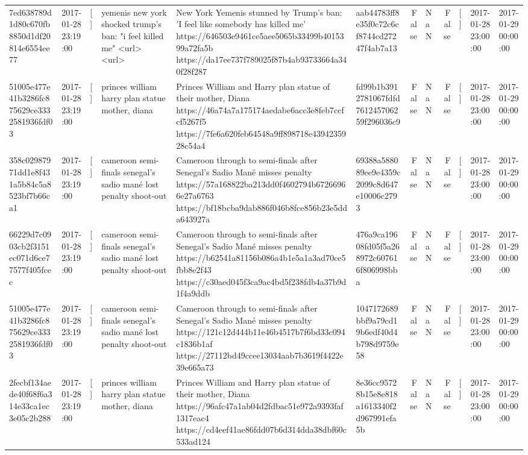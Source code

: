 \begin{tabular}{llllllrlrlll}
7ed638789d1d80c670fb8850d1df20814e6554ee77 & 2017-01-28 23:19:00 & [] & yemenis new york shocked trump's ban: "i feel killed me" <url> <url> & New York Yemenis stunned by Trump's ban: 'I feel like somebody has killed me' https://646503e9461ce5aee5065b33499b4015399a72fa5b https://da17ee737f789025f87b4ab93733664a340f28f287 & aab44783ff8e35f0c72c6cf8744cd27247f4ab7a13 & False & NaN & False & [] & 2017-01-28 23:00:00 & 2017-01-29 00:00:00 \\
51005e477e41b3286fc875629ce3332581936fdf03 & 2017-01-28 23:19:00 & [] & princes william harry plan statue mother, diana & Princes William and Harry plan statue of their mother, Diana https://46a74a7a175174aedabe6acc3e8feb7ccfcf5267f5 https://7fe6a620feb64548a9ff898718e4394235928c54a4 & fd99b1b3912781067fdfd761245706259f296036c9 & False & NaN & False & [] & 2017-01-28 23:00:00 & 2017-01-29 00:00:00 \\
358c02987971dd1e8f431a5b84c5a8523bf7b66ca1 & 2017-01-28 23:19:00 & [] & cameroon semi-finals senegal's sadio mané lost penalty shoot-out & Cameroon through to semi-finals after Senegal’s Sadio Mané misses penalty https://57a168822ba213dd0f4602794b67266966e27a6763 https://bf18bcba9dab886f046b8fce856b23e5dda643927a & 69388a588089ee9e4359c2099c8d647e10006c2793 & False & NaN & False & [] & 2017-01-28 23:00:00 & 2017-01-29 00:00:00 \\
66229d7c0903cb2f3151ec071d6ce77577f405fcec & 2017-01-28 23:19:00 & [] & cameroon semi-finals senegal's sadio mané lost penalty shoot-out & Cameroon through to semi-finals after Senegal’s Sadio Mané misses penalty https://b62541a81156b086a4b1e5a1a3ad70ce5fbb8e2f43 https://c30aed045f3ca9ac4bd5f238fdb4a37b9d1f4a9ddb & 476a9ca19608fd05f5a268972c607616f806998bba & False & NaN & False & [] & 2017-01-28 23:00:00 & 2017-01-29 00:00:00 \\
51005e477e41b3286fc875629ce3332581936fdf03 & 2017-01-28 23:19:00 & [] & cameroon semi-finals senegal's sadio mané lost penalty shoot-out & Cameroon through to semi-finals after Senegal’s Sadio Mané misses penalty https://121c12d444b11e46b4517b7f6bd33c094c1836b1af https://27112bd49ccee13034aab7b3619f4422e39e665a73 & 1047172689bbf9a79cd19b6edf40d4b798d9759e58 & False & NaN & False & [] & 2017-01-28 23:00:00 & 2017-01-29 00:00:00 \\
2fecbf134aede40f68f6a314e33ca1ec3e05c2b288 & 2017-01-28 23:19:00 & [] & princes william harry plan statue mother, diana & Princes William and Harry plan statue of their mother, Diana https://96afc47a1ab04d2fdbac51e972a9393faf1317eac4 https://cd4eef41ae86fdd07b6d314dda38dbf60c533ad124 & 8e36cc95728b15e8e818a1613340f2d967991efa5b & False & NaN & False & [] & 2017-01-28 23:00:00 & 2017-01-29 00:00:00 \\

\end{tabular}
